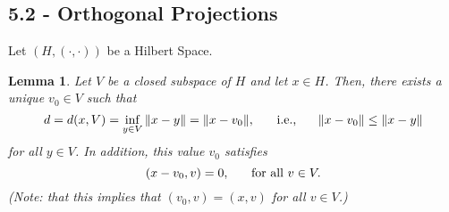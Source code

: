 \documentclass[12pt]{article}
\newtheorem{lemma}{Lemma}
\newcommand{\inner}{(\cdot, \cdot)}
\begin{document}
\subsection*{5.2 - Orthogonal Projections}
Let $(H, \inner)$ be a Hilbert Space. 
\begin{lemma}
Let $V$ be a closed subspace of $H$ and let $x \in H$. Then, there exists a unique $v_0 \in V$ such that 
\begin{equation}
d = d(x, V) = \inf\limits_{y \in V} \| x - y \| = \| x - v_0 \|, \hspace{5mm} \text{ i.e., } \hspace{5mm} \| x - v_0 \| \leq \| x - y \| 
\end{equation}
for all $y \in V$. In addition, this value $v_0$ satisfies 
\begin{equation}
(x - v_0, v) = 0, \hspace{5mm} \text{ for all } v \in V. 
\end{equation}
(Note: that this implies that $(v_0, v) = (x, v)$ for all $v \in V$.)
\end{lemma}
\vspace{-25pt}
\end{document}
